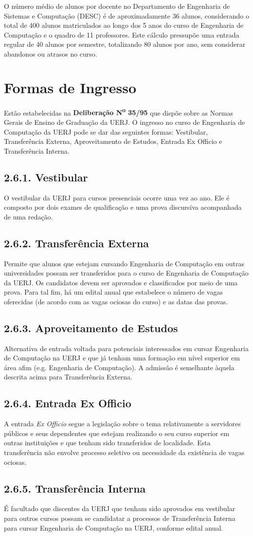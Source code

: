 O número médio de alunos por docente no Departamento de Engenharia de Sistemas e Computação (DESC) é de aproximadamente 36 alunos, considerando o total de 400 alunos matriculados ao longo dos 5 anos do curso de Engenharia de Computação e o quadro de 11 professores. Este cálculo pressupõe uma entrada regular de 40 alunos por semestre, totalizando 80 alunos por ano, sem considerar abandonos ou atrasos no curso.  

\section{Formas de Ingresso}

Estão estabelecidas na \textbf{Deliberação N\textsuperscript{o} 35/95} que dispõe sobre as Normas Gerais de Ensino de Graduação da UERJ. O ingresso no curso de Engenharia de Computação da UERJ pode se dar das seguintes formas: Vestibular, Transferência Externa, Aproveitamento de Estudos, Entrada Ex Officio e Transferência Interna.

\subsection*{2.6.1. Vestibular}
O vestibular da UERJ para cursos presenciais ocorre uma vez ao ano. Ele é composto por dois exames de qualificação e uma prova discursiva acompanhada de uma redação.

\subsection*{2.6.2. Transferência Externa}
Permite que alunos que estejam cursando Engenharia de Computação em outras universidades possam ser transferidos para o curso de Engenharia de Computação da UERJ. Os candidatos devem ser aprovados e classificados por meio de uma prova. Para tal fim, há um edital anual que estabelece o número de vagas oferecidas (de acordo com as vagas ociosas do curso) e as datas das provas.

\subsection*{2.6.3. Aproveitamento de Estudos}
Alternativa de entrada voltada para potenciais interessados em cursar Engenharia de Computação na UERJ e que já tenham uma formação em nível superior em área afim (e.g. Engenharia de Computação). A admissão é semelhante àquela descrita acima para Transferência Externa.

\subsection*{2.6.4. Entrada Ex Officio}
A entrada \textit{Ex Officio} segue a legislação sobre o tema relativamente a servidores públicos e seus dependentes que estejam realizando o seu curso superior em outras instituições e que tenham sido transferidos de localidade. Esta transferência não envolve processo seletivo ou necessidade da existência de vagas ociosas.

\subsection*{2.6.5. Transferência Interna}
É facultado que discentes da UERJ que tenham sido aprovados em vestibular para outros cursos possam se candidatar a processos de Transferência Interna para cursar Engenharia de Computação na UERJ, conforme edital anual.




